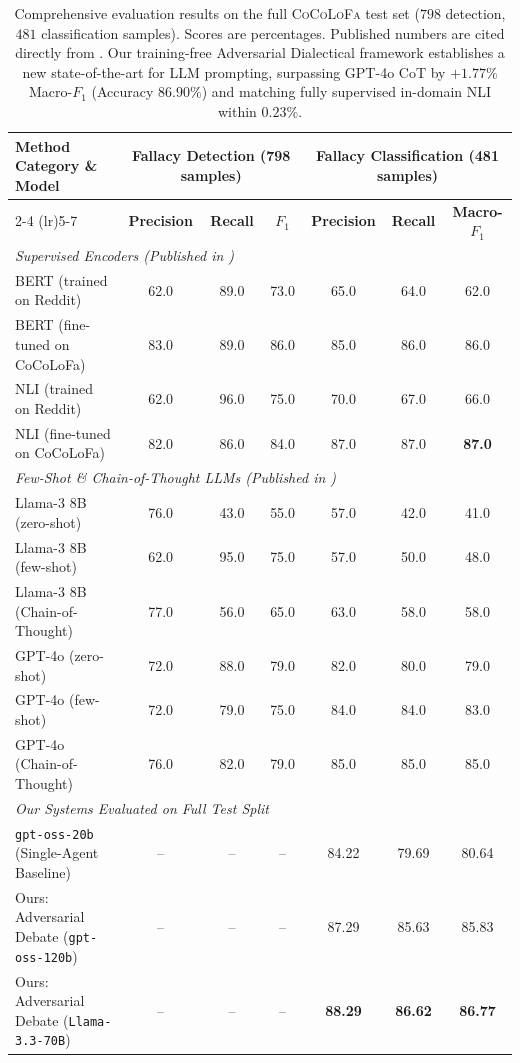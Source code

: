 \documentclass[11pt]{article}
\begin{document}
\begin{table}[t]
\centering
\small
\begin{tabular}{lcccccc}
\toprule
\multirow{2}{*}{\textbf{Method Category \& Model}} & \multicolumn{3}{c}{\textbf{Fallacy Detection (798 samples)}} & \multicolumn{3}{c}{\textbf{Fallacy Classification (481 samples)}} \\
\cmidrule(lr){2-4} \cmidrule(lr){5-7}
& \textbf{Precision} & \textbf{Recall} & \textbf{$F_1$} & \textbf{Precision} & \textbf{Recall} & \textbf{Macro-$F_1$} \\
\midrule
\multicolumn{7}{l}{\textit{Supervised Encoders (Published in \citet{cocolofa2024})}} \\
BERT (trained on Reddit) & 62.0 & 89.0 & 73.0 & 65.0 & 64.0 & 62.0 \\
BERT (fine-tuned on CoCoLoFa) & 83.0 & 89.0 & 86.0 & 85.0 & 86.0 & 86.0 \\
NLI (trained on Reddit) & 62.0 & 96.0 & 75.0 & 70.0 & 67.0 & 66.0 \\
NLI (fine-tuned on CoCoLoFa) & 82.0 & 86.0 & 84.0 & 87.0 & 87.0 & \textbf{87.0} \\
\midrule
\multicolumn{7}{l}{\textit{Few-Shot \& Chain-of-Thought LLMs (Published in \citet{cocolofa2024})}} \\
Llama-3 8B (zero-shot) & 76.0 & 43.0 & 55.0 & 57.0 & 42.0 & 41.0 \\
Llama-3 8B (few-shot) & 62.0 & 95.0 & 75.0 & 57.0 & 50.0 & 48.0 \\
Llama-3 8B (Chain-of-Thought) & 77.0 & 56.0 & 65.0 & 63.0 & 58.0 & 58.0 \\
GPT-4o (zero-shot) & 72.0 & 88.0 & 79.0 & 82.0 & 80.0 & 79.0 \\
GPT-4o (few-shot) & 72.0 & 79.0 & 75.0 & 84.0 & 84.0 & 83.0 \\
GPT-4o (Chain-of-Thought) & 76.0 & 82.0 & 79.0 & 85.0 & 85.0 & 85.0 \\
\midrule
\multicolumn{7}{l}{\textit{Our Systems Evaluated on Full Test Split}} \\
\texttt{gpt-oss-20b} (Single-Agent Baseline) & -- & -- & -- & 84.22 & 79.69 & 80.64 \\
Ours: Adversarial Debate (\texttt{gpt-oss-120b}) & -- & -- & -- & 87.29 & 85.63 & 85.83 \\
Ours: Adversarial Debate (\texttt{Llama-3.3-70B}) & -- & -- & -- & \textbf{88.29} & \textbf{86.62} & \textbf{86.77} \\
\bottomrule
\end{tabular}
\caption{Comprehensive evaluation results on the full \textsc{CoCoLoFa} test set ($798$ detection, $481$ classification samples). Scores are percentages. Published numbers are cited directly from \citet{cocolofa2024}. Our training-free Adversarial Dialectical framework establishes a new state-of-the-art for LLM prompting, surpassing GPT-4o CoT by $+1.77\%$ Macro-$F_1$ (Accuracy $86.90\%$) and matching fully supervised in-domain NLI within $0.23\%$.}
\label{tab:full_test_results}
\end{table}
\end{document}
